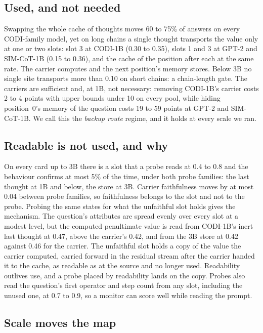 \documentclass{article}
\begin{document}
\subsection{Used, and not needed}

Swapping the whole cache of thoughts moves 60 to 75\% of answers on every CODI-family model, yet on long chains a single thought transports the value only at one or two slots: slot 3 at CODI-1B (0.30 to 0.35), slots 1 and 3 at GPT-2 and SIM-CoT-1B (0.15 to 0.36), and the cache of the position after each at the same rate. The carrier computes and the next position's memory stores. Below 3B no single site transports more than 0.10 on short chains: a chain-length gate. The carriers are sufficient and, at 1B, not necessary: removing CODI-1B's carrier costs 2 to 4 points with upper bounds under 10 on every pool, while hiding position~0's memory of the question costs 19 to 59 points at GPT-2 and SIM-CoT-1B. We call this the \emph{backup route} regime, and it holds at every scale we ran.

\subsection{Readable is not used, and why}

On every card up to 3B there is a slot that a probe reads at 0.4 to 0.8 and the behaviour confirms at most 5\% of the time, under both probe families: the last thought at 1B and below, the store at 3B. Carrier faithfulness moves by at most 0.04 between probe families, so faithfulness belongs to the slot and not to the probe. Probing the same states for what the unfaithful slot holds gives the mechanism. The question's attributes are spread evenly over every slot at a modest level, but the computed penultimate value is read from CODI-1B's inert last thought at 0.47, above the carrier's 0.42, and from the 3B store at 0.42 against 0.46 for the carrier. The unfaithful slot holds a copy of the value the carrier computed, carried forward in the residual stream after the carrier handed it to the cache, as readable as at the source and no longer used. Readability outlives use, and a probe placed by readability lands on the copy. Probes also read the question's first operator and step count from any slot, including the unused one, at 0.7 to 0.9, so a monitor can score well while reading the prompt.

\subsection{Scale moves the map}
\end{document}
